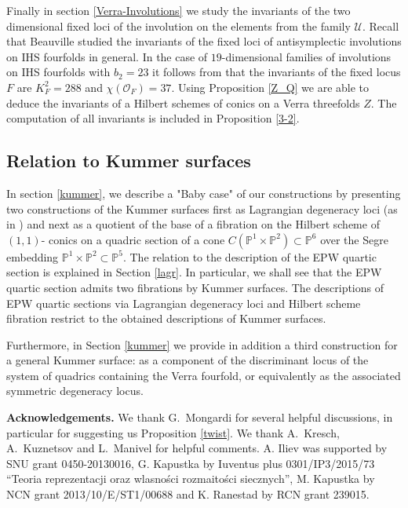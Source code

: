 \documentclass[a4paper,11pt]{amsart}
\theoremstyle{definition}
\numberwithin{equation}{section}
\numberwithin{equation}{section} \theoremstyle{definition}
\begin{document}
  

Finally in section \ref{Verra-Involutions} we study the invariants of the two dimensional fixed loci of the involution on the elements from the family $\mathcal{U}$.
 Recall that Beauville studied the invariants of the fixed loci of antisymplectic involutions on IHS fourfolds in general.
In the case of $19$-dimensional families of involutions on IHS fourfolds with $b_2=23$ it follows from \cite[Theorem~2]{beau-invo}
that the invariants of the fixed locus $F$ are $K^2_F=288$ and $\chi({\mathcal O}_F)=37$. 
Using Proposition \ref{Z_Q} we are able to deduce  the invariants of a Hilbert schemes of conics on a Verra threefolds $Z$. 
The computation of all invariants is included in Proposition \ref{3-2}.

\subsection{Relation to Kummer surfaces} In section \ref{kummer}, we describe a "Baby case" of our constructions by presenting two constructions of the Kummer surfaces first as Lagrangian degeneracy loci (as in \cite[Theorem~9.2]{EPW}) and next as a quotient of the base of a fibration on the Hilbert scheme of $(1,1)$- conics on a quadric section of a cone $C({{\mathbb{P}}}^1\times {{\mathbb{P}}}^2)\subset {{\mathbb{P}}}^6$ over the Segre embedding ${{\mathbb{P}}}^1\times {{\mathbb{P}}}^2\subset {{\mathbb{P}}}^5$.
The relation to the description of the EPW quartic section is explained in Section \ref{lagr}. In particular, we shall see that the EPW quartic section admits two fibrations by Kummer surfaces. The descriptions of EPW quartic sections via Lagrangian degeneracy loci and Hilbert scheme fibration restrict to the obtained descriptions of Kummer surfaces.

 Furthermore, in Section \ref{kummer} we provide in addition a third construction for a general Kummer surface: as a component of the discriminant locus of the system of quadrics containing the Verra fourfold, or equivalently as the associated symmetric degeneracy locus.

{\bf Acknowledgements.} We thank G.~Mongardi for several helpful discussions, in particular for suggesting us Proposition \ref{twist}. We thank A.~Kresch,  A.~Kuznetsov and L.~Manivel for helpful comments. A. Iliev was supported by SNU grant 0450-20130016, G. Kapustka by Iuventus plus 0301/IP3/2015/73 ``Teoria reprezentacji oraz wlasno\'{s}ci rozmaito\'{s}ci siecznych'', M. Kapustka by NCN grant 2013/10/E/ST1/00688 and K. Ranestad by RCN grant 239015.
\end{document}
